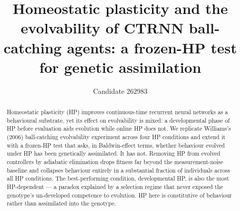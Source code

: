 \documentclass[11pt,a4paper]{article}
\title{\sffamily Homeostatic plasticity and the evolvability of CTRNN
ball-catching agents: a frozen-HP test for genetic assimilation}
\author{Candidate 262983}
\date{}
\begin{document}
\maketitle

\begin{abstract}
Homeostatic plasticity (HP) improves continuous-time recurrent neural networks
as a behavioural substrate, yet its effect on evolvability is mixed: a
developmental phase of HP before evaluation aids evolution while online HP does
not. We replicate Williams's (2006) ball-catching evolvability experiment across
four HP conditions and extend it with a frozen-HP test that asks, in
Baldwin-effect terms, whether behaviour evolved under HP has been genetically
assimilated. It has not. Removing HP from evolved controllers by adiabatic
elimination drops fitness far beyond the measurement-noise baseline and
collapses behaviour entirely in a substantial fraction of individuals across all
HP conditions. The best-performing condition, developmental HP, is also the most
HP-dependent --- a paradox explained by a selection regime that never exposed
the genotype's un-developed competence to evolution. HP here is constitutive of
behaviour rather than assimilated into the genotype.
\end{abstract}











\end{document}
